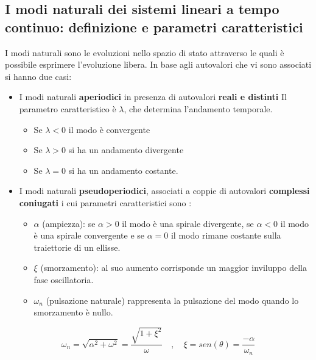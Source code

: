 \documentclass{article}
\begin{document}
\subsection{I modi naturali dei sistemi lineari a tempo continuo: definizione e parametri caratteristici}

I modi naturali sono le evoluzioni nello spazio di stato attraverso le quali è possibile esprimere l'evoluzione libera.
In base agli autovalori che vi sono associati si hanno due casi:\\
\begin{itemize}
    \item I modi naturali \textbf{aperiodici} in presenza di autovalori \textbf{reali e distinti}
    Il parametro caratteristico è $\lambda$, che determina l'andamento temporale.
    \begin{itemize}
        \item   Se $\lambda<0$ il modo è convergente
        \item   Se $\lambda>0$ si ha un andamento divergente
        \item   Se $\lambda=0$ si ha un andamento costante.
    \end{itemize}
    \item I modi naturali \textbf{pseudoperiodici}, associati a coppie di autovalori \textbf{complessi coniugati}
    i cui parametri caratteristici sono :
    \begin{itemize}
        \item $\alpha$ (ampiezza): se $\alpha>0$ il modo è una spirale divergente,
        se $\alpha<0$ il modo è una spirale convergente
        e se $\alpha=0$ il modo rimane costante sulla traiettorie di un ellisse.
    \item $\xi$ (smorzamento): al suo aumento  corrisponde un maggior inviluppo della fase oscillatoria.
    \item $\omega_n$ (pulsazione naturale) rappresenta la pulsazione del modo quando lo smorzamento è nullo.
    \end{itemize}
\end{itemize}
\[ \omega_n=\sqrt{\alpha^2+\omega^2}=\frac{\sqrt{1+\xi^2}}{\omega}\quad , \quad \xi=sen(\theta)=\frac{-\alpha}{\omega_n} \]
\end{document}
